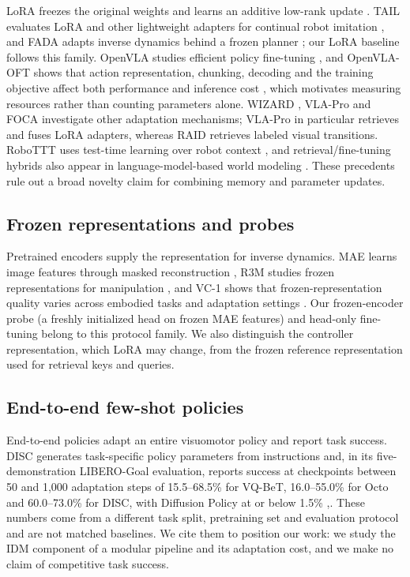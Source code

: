 \documentclass[11pt,a4paper]{article}
\begin{document}
LoRA freezes the original weights and learns an additive low-rank update \cite{ref12}. TAIL evaluates LoRA and other lightweight adapters for continual robot imitation \cite{ref10}, and FADA adapts inverse dynamics behind a frozen planner \cite{ref11}; our LoRA baseline follows this family. OpenVLA studies efficient policy fine-tuning \cite{ref33}, and OpenVLA-OFT shows that action representation, chunking, decoding and the training objective affect both performance and inference cost \cite{ref34}, which motivates measuring resources rather than counting parameters alone. WIZARD \cite{ref35}, VLA-Pro \cite{ref18} and FOCA \cite{ref36} investigate other adaptation mechanisms; VLA-Pro in particular retrieves and fuses LoRA adapters, whereas RAID retrieves labeled visual transitions. RoboTTT uses test-time learning over robot context \cite{ref37}, and retrieval/fine-tuning hybrids also appear in language-model-based world modeling \cite{ref38}. These precedents rule out a broad novelty claim for combining memory and parameter updates.

\subsection{Frozen representations and probes}

Pretrained encoders supply the representation for inverse dynamics. MAE learns image features through masked reconstruction \cite{ref39}, R3M studies frozen representations for manipulation \cite{ref40}, and VC-1 shows that frozen-representation quality varies across embodied tasks and adaptation settings \cite{ref41}. Our frozen-encoder probe (a freshly initialized head on frozen MAE features) and head-only fine-tuning belong to this protocol family. We also distinguish the controller representation, which LoRA may change, from the frozen reference representation used for retrieval keys and queries.

\subsection{End-to-end few-shot policies}

End-to-end policies adapt an entire visuomotor policy and report task success. DISC generates task-specific policy parameters from instructions and, in its five-demonstration LIBERO-Goal evaluation, reports success at checkpoints between 50 and 1,000 adaptation steps of 15.5--68.5\% for VQ-BeT, 16.0--55.0\% for Octo and 60.0--73.0\% for DISC, with Diffusion Policy at or below 1.5\% \cite{ref13,ref14},\cite{ref15,ref42}. These numbers come from a different task split, pretraining set and evaluation protocol and are not matched baselines. We cite them to position our work: we study the IDM component of a modular pipeline and its adaptation cost, and we make no claim of competitive task success.
\end{document}
